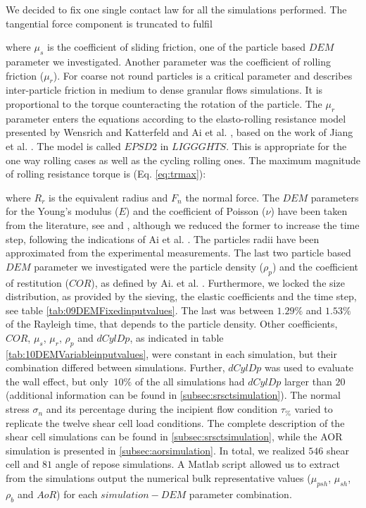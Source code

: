 We decided to fix one single
contact law for all the simulations performed.
The tangential force component is truncated to fulfil 

where $\mu_s$ is the coefficient of sliding friction, one of the particle based
$DEM$ parameter we investigated. 
Another parameter was the coefficient of rolling friction ($\mu_r$). 
For coarse not round particles is a critical parameter and describes inter-particle 
friction in medium to dense granular flows simulations. It is proportional to the 
torque counteracting the rotation of the particle. The $\mu_r$ parameter enters the 
equations according to the elasto-rolling resistance model presented by Wensrich and 
Katterfeld \cite{RefWorks:87} and Ai et al. \cite{RefWorks:131}, 
based on the work of Jiang et al. \cite{RefWorks:143}. 
The model is called $EPSD2$ in $LIGGGHTS$. This is appropriate for the one way
rolling cases as well as the cycling rolling ones.
The maximum magnitude of rolling resistance torque is (Eq. \ref{eq:trmax}):

where $R_r$ is the equivalent radius and $F_n$ the normal force.
The $DEM$ parameters for the Young's modulus ($E$) and the coefficient of Poisson ($\nu$) 
have been taken from the literature, see \cite{RefWorks:175} and \cite{RefWorks:176}, 
although we reduced the former to increase the time step, following the indications of Ai et al. \cite{RefWorks:131}. 
The particles radii have been approximated from the experimental measurements. 
The last two particle based $DEM$ parameter we investigated were the particle density 
($\rho_p$) and the coefficient of restitution ($COR$), as defined by Ai. et al. \cite{RefWorks:131}. 
Furthermore, we locked the size distribution, as provided by the sieving, the
elastic coefficients and the time step, see table
\ref{tab:09DEMFixedinputvalues}.
The last was between $1.29 \%$ and $1.53 \%$ of the Rayleigh time, that depends
to the particle density.
Other coefficients, $COR$, $\mu_s$, $\mu_r$,
$\rho_p$ and $dCylDp$, as indicated in table \ref{tab:10DEMVariableinputvalues},
were constant in each simulation, but their combination differed between
simulations.
Further, $dCylDp$ was used to evaluate the wall effect, but only $~10\%$ of the
all simulations had $dCylDp$ larger than $20$ (additional information can be found in \ref{subsec:srsctsimulation}). 
The normal stress $\sigma_n$ and its
percentage during the incipient flow condition $\tau_{\%}$
varied to replicate the twelve shear cell load conditions. 
The complete description of the shear cell simulations can be found in \ref{subsec:srsctsimulation}, 
while the AOR simulation is presented in \ref{subsec:aorsimulation}.
In total, we realized $546$ shear cell and $81$ angle of repose simulations.
A Matlab script allowed us to extract from the simulations output the numerical
bulk representative values ($\mu_{psh}$, $\mu_{sh}$, $\rho_b$ and $AoR$) for each $simulation-DEM$ parameter combination. 

